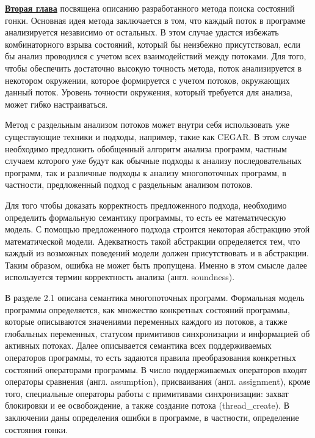 \underline{\textbf{Вторая глава}} посвящена описанию разработанного метода поиска состояний гонки.
Основная идея метода заключается в том, что каждый поток в программе анализируется независимо от остальных.
В этом случае удастся избежать комбинаторного взрыва состояний, который бы неизбежно присутствовал, если бы анализ проводился с учетом всех взаимодействий между потоками.
Для того, чтобы обеспечить достаточно высокую точность метода, поток анализируется в некотором окружении, которое формируется с учетом потоков, окружающих данный поток. 
Уровень точности окружения, который требуется для анализа, может гибко настраиваться.

Метод с раздельным анализом потоков может внутри себя использовать уже существующие техники и подходы, например, такие как CEGAR.
В этом случае необходимо предложить обобщенный алгоритм анализа программ, частным случаем которого уже будут как обычные подходы к анализу последовательных программ, так и различные подходы к анализу многопоточных программ, в частности, предложенный подход с раздельным анализом потоков. 

Для того чтобы доказать корректность предложенного подхода, необходимо определить формальную семантику программы, то есть ее математическую модель.
С помощью предложенного подхода строится некоторая абстракцию этой математической модели. 
Адекватность такой абстракции определяется тем, что каждый из возможных поведений модели должен присутствовать и в абстракции.
Таким образом, ошибка не может быть пропущена.
Именно в этом смысле далее используется термин корректность анализа (англ. soundness).

В разделе 2.1 описана семантика многопоточных программ. 
Формальная модель программы определяется, как множество конкретных состояний программы, которые описываются значениями переменных каждого из потоков, а также глобальных переменных, статусом примитивов синхронизации и информацией об активных потоках.
Далее описывается семантика всех поддерживаемых операторов программы, то есть задаются правила преобразования конкретных состояний операторами программы.
В число поддерживаемых операторов входят операторы сравнения (англ. assumption), присваивания (англ. assignment),
кроме того, специальные операторы работы с примитивами синхронизации: захват блокировки и ее освобождение, а также создание потока (thread\_create).
В заключении даны определения ошибки в программе, в частности, определение состояния гонки.

